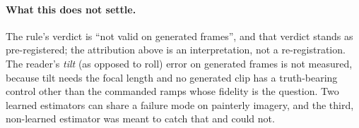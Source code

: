 \paragraph{What this does not settle.}
The rule's verdict is ``not valid on generated frames'', and that verdict stands as
pre-registered; the attribution above is an interpretation, not a re-registration.  The
reader's \emph{tilt} (as opposed to roll) error on generated frames is not measured, because
tilt needs the focal length and no generated clip has a truth-bearing control other than the
commanded ramps whose fidelity is the question.  Two learned estimators can share a failure
mode on painterly imagery, and the third, non-learned estimator was meant to catch that and
could not.
